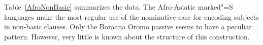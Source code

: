 



Table~\vref{AfroNonBasic} summarizes the data. 
The Afro-Asiatic marked"=S languages make the most regular use of the nominative-case for encoding subjects in non-basic clauses. 
Only the Boraana Oromo passive seems to have a peculiar pattern.
However, very little is known about the structure of this construction.%

